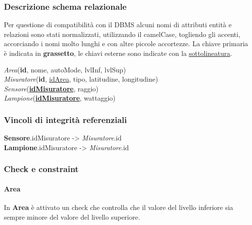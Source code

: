 \subsubsection{Descrizione schema relazionale}

Per questione di compatibilità con il DBMS alcuni nomi di attributi entità e relazioni sono stati normalizzati, utilizzando il camelCase, togliendo gli accenti, accorciando i nomi molto lunghi e con altre piccole accortezze.
La chiave primaria è indicata in \textbf{grassetto}, le chiavi esterne sono indicate con la \underline{sottolineatura}.

\textit{Area}(\textbf{id}, nome, autoMode, lvlInf, lvlSup) \\
\textit{Misuratore}(\textbf{id}, \underline{idArea}, tipo, latitudine, longitudine) \\
\textit{Sensore}(\underline{\textbf{idMisuratore}}, raggio) \\
\textit{Lampione}(\underline{\textbf{idMisuratore}}, wattaggio)

\subsubsection{Vincoli di integrità referenziali}

\textbf{Sensore}.idMisuratore -> \textit{Misuratore}.id \\
\textbf{Lampione}.idMisuratore -> \textit{Misuratore}.id

\subsubsection{Check e constraint}

\paragraph{Area} In \textbf{Area} è attivato un check che controlla che il valore del livello inferiore sia sempre minore del valore del livello superiore.
